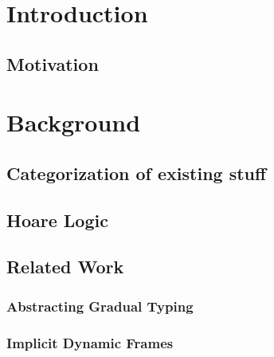 
\chapter{Introduction}
\label{ch:introduction}


    \section{Motivation}
    \label{sec:motivationexamples}
    



\chapter{Background}

\section{Categorization of existing stuff}
\label{sec:categorization-of-existing}


\section{Hoare Logic}
\label{sec:hoare-logic}


\section{Related Work}
    \subsection{Abstracting Gradual Typing}
    \label{ssec:abstracting-gradual-typing}
    
    
    \subsection{Implicit Dynamic Frames}
    \label{ssec:implicit-dynamic-frames}
    




